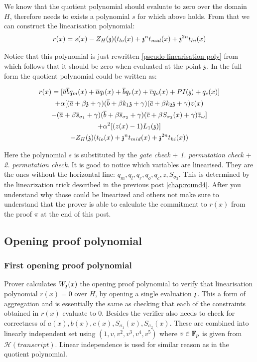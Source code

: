 We know that the quotient polynomial should evaluate to zero over the domain $H$, therefore needs to exists a polynomial $s$ for which above holds. From that we can construct the linearisation polynomial:
$$r(x) = s(x) - Z_H(\mathfrak{z})(t_{lo}(x) + \mathfrak{z}^n t_{mid}(x) + \mathfrak{z}^{2n}t_{hi}(x)$$

Notice that this polynomial is just rewritten \eqref{pseudo-linearisation-poly} from which follows that it should be zero when evaluated at the point $\mathfrak{z}$. In the full form the quotient polynomial could be written as:

\begin{multline}
    r(x) = [\overline{a}\overline{b}q_m(x) + \overline{a}q_l(x) + \overline{b}q_r(x) + \overline{c}q_o(x) + PI(\mathfrak{z}) + q_c(x)] \\
    + \alpha [
        (\overline{a} + \beta \mathfrak{z} + \gamma)(\overline{b} + \beta k_1 \mathfrak{z} + \gamma)(\overline{c} + \beta k_2 \mathfrak{z} + \gamma)z(x) \\
        - (\overline{a} + \beta \overline{s}_{\sigma_1} + \gamma)(\overline{b} + \beta \overline{s}_{\sigma_2} + \gamma)(\overline{c} + \beta S_{\sigma_3}(x) + \gamma)\overline{z}_{\omega}
    ] \\
    + \alpha^2 [(z(x) -1)L_1(\mathfrak{z})] \\
    - Z_H(\mathfrak{z})(t_{lo}(x) + \mathfrak{z}^n t_{mid}(x) + \mathfrak{z}^{2n} t_{hi}(x))
\end{multline}

Here the polynomial $s$ is substituted by the \textit{gate check} + \textit{1. permutation check} + \textit{2. permutation check}. It is good to notice which variables are linearised. They are the ones without the horizontal line: $q_m, q_l, q_r, q_o, q_c, z, S_{\sigma_3}$. This is determined by the linearization trick described in the previous post \eqref{chap:round4}. After you understand why those could be linearized and others not make sure to understand that the prover is able to calculate the commitment to $r(x)$ from the proof $\pi$ at the end of this post. 

\subsection{Opening proof polynomial}

\subsubsection{First opening proof polynomial}
Prover calculates $W_{\mathfrak{z}}(x)$ the opening proof polynomial to verify that linearisation polynomial $r(x) = 0$ over $H$, by opening a single evaluation $\mathfrak{z}$. This a form of aggregation and is essentially the same as checking that each of the constraints obtained in $r(x)$ evaluate to 0. Besides the verifier also needs to check for correctness of $a(x), b(x), c(x), S_{\sigma_1}(x), S_{\sigma_2}(x)$. These are combined into linearly independent set using $(1, v, v^2, v^3, v^4, v^5)$ where $v \in \mathbb{F}_p$ is given from $\mathcal{H}(transcript)$. Linear independence is used for similar reason as in the quotient polynomial.

